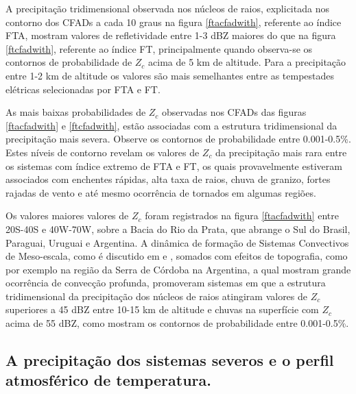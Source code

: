 A precipitação tridimensional observada nos núcleos de raios, explicitada nos contorno dos CFADs a cada 10 graus na figura \ref{ftacfadwith}, referente ao índice FTA, mostram valores de refletividade entre 1-3 dBZ maiores do que na figura \ref{ftcfadwith}, referente ao índice FT, principalmente quando observa-se os contornos de probabilidade de $Z_c$ acima de 5 km de altitude. Para a precipitação entre 1-2 km de altitude os valores são mais semelhantes entre as tempestades elétricas selecionadas por FTA e FT. 


As mais baixas probabilidades de $Z_c$ observadas nos CFADs das figuras \ref{ftacfadwith} e \ref{ftcfadwith}, estão associadas com a estrutura tridimensional da precipitação mais severa. Observe os contornos de probabilidade entre 0.001-0.5\%. Estes níveis de contorno revelam os valores de $Z_c$ da precipitação mais rara entre os sistemas com índice extremo de FTA e FT, os quais provavelmente estiveram associados com enchentes rápidas, alta taxa de raios, chuva de granizo, fortes rajadas de vento e até mesmo ocorrência de tornados em algumas regiões. 

Os valores maiores valores de $Z_c$ foram registrados na figura \ref{ftacfadwith} entre 20S-40S e 40W-70W, sobre a Bacia do Rio da Prata, que abrange o Sul do Brasil, Paraguai, Uruguai e Argentina. A dinâmica de formação de Sistemas Convectivos de Meso-escala, como é discutido em \cite{Velasco1987} e \cite{Durkee2009}, somados com efeitos de topografia, como por exemplo na região da Serra de Córdoba na Argentina, a qual \cite{Rasmussen2011} mostram grande ocorrência de convecção profunda, promoveram sistemas em que a estrutura tridimensional da precipitação dos núcleos de raios atingiram valores de $Z_c$ superiores a 45 dBZ entre 10-15 km de altitude e chuvas na superfície com $Z_c$ acima de 55 dBZ, como mostram os contornos de probabilidade entre 0.001-0.5\%.

\subsection{A precipitação dos sistemas severos e o perfil atmosférico de temperatura.}

